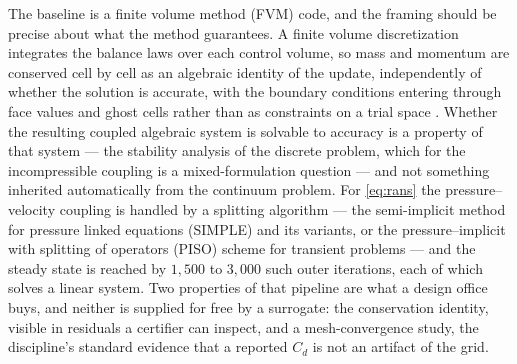The baseline is a finite volume method (FVM) code, and the framing should be precise about what
the method guarantees.
A finite volume discretization integrates the balance laws over each
control volume, so mass and momentum are conserved cell by cell as an algebraic identity of the
update, independently of whether the solution is accurate, with the boundary conditions entering
through face values and ghost cells rather than as constraints on a trial space
\cite{leveque2002finite}. Whether the resulting coupled algebraic system is solvable to accuracy is
a property of that system --- the stability analysis of the discrete problem, which for the
incompressible coupling is a mixed-formulation question \cite{quarteroni2008numerical} --- and not
something inherited automatically from the continuum problem. For \eqref{eq:rans} the
pressure--velocity coupling is handled
by a splitting algorithm --- the semi-implicit method for pressure linked equations (SIMPLE)
and its variants, or the pressure--implicit with splitting of operators (PISO) scheme for
transient problems --- and the steady state is reached by $1{,}500$ to $3{,}000$ such outer
iterations, each of which solves a linear system.
Two properties of that pipeline are what a design office buys, and neither is supplied for free
by a surrogate: the conservation identity, visible in residuals a certifier can inspect, and a
mesh-convergence study, the discipline's standard evidence that a reported $C_d$ is not an
artifact of the grid.

